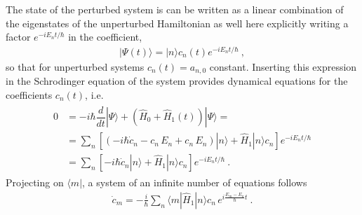 \documentclass[letterpaper,10pt,english]{jupyterBook}
\begin{document}
\sphinxAtStartPar
{} The state of the perturbed system is can be written as a linear combination of the eigenstates of the unperturbed Hamiltonian as well \sphinxhyphen{} here explicitly writing a factor \(e^{-i E_n t / \hbar}\) in the coefficient,
\begin{equation*}
\begin{split}| \Psi(t) \rangle = | n \rangle c_n(t) e^{-i E_n t / \hbar} \ ,\end{split}
\end{equation*}
\sphinxAtStartPar
so that for unperturbed systems \(c_n(t) = a_{n,0}\) constant. Inserting this expression in the Schrodinger equation of the system provides dynamical equations for the coefficients \(c_n(t)\), i.e.
\begin{equation*}
\begin{split}\begin{aligned}
 0
 & = - i \hbar \dfrac{d}{dt} | \Psi \rangle + \left( \hat{H}_0 + \hat{H}_1(t) \right) | \Psi \rangle = \\
 & = \sum_n \left[ \left( - i \hbar \dot{c}_n - c_n \, E_n + c_n \, E_n \right) | n \rangle + \hat{H}_1 | n \rangle c_n \right] e^{-i E_n t/\hbar} \\
 & = \sum_n \left[ - i \hbar \dot{c}_n |  n \rangle + \hat{H}_1 | n \rangle c_n \right] e^{-i E_n t/\hbar} \ .
\end{aligned}\end{split}
\end{equation*}
\sphinxAtStartPar
Projecting on \(\langle m |\), a system of an infinite number of equations follows
\begin{equation*}
\begin{split}\dot{c}_m = - \frac{i}{\hbar} \sum_{n} \langle m | \hat{H}_1 | n \rangle c_n \, e^{i \frac{E_m - E_n}{\hbar} t} \ .\end{split}
\end{equation*}
\end{document}
